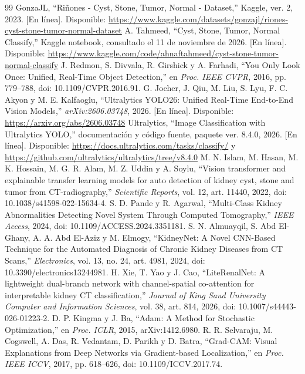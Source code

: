 \begin{thebibliography}{99}
GonzaJL, ``Riñones - Cyst, Stone, Tumor, Normal - Dataset,'' Kaggle, ver. 2, 2023. [En línea]. Disponible: \url{https://www.kaggle.com/datasets/gonzajl/riones-cyst-stone-tumor-normal-dataset}
A. Tahmeed, ``Cyst, Stone, Tumor, Normal Classify,'' Kaggle notebook, consultado el 11 de noviembre de 2026. [En línea]. Disponible: \url{https://www.kaggle.com/code/ahnaftahmeed/cyst-stone-tumor-normal-classify}
J. Redmon, S. Divvala, R. Girshick y A. Farhadi, ``You Only Look Once: Unified, Real-Time Object Detection,'' en \emph{Proc. IEEE CVPR}, 2016, pp. 779--788, doi: 10.1109/CVPR.2016.91.
G. Jocher, J. Qiu, M. Liu, S. Lyu, F. C. Akyon y M. E. Kalfaoglu, ``Ultralytics YOLO26: Unified Real-Time End-to-End Vision Models,'' \emph{arXiv:2606.03748}, 2026. [En línea]. Disponible: \url{https://arxiv.org/abs/2606.03748}
Ultralytics, ``Image Classification with Ultralytics YOLO,'' documentación y código fuente, paquete ver. 8.4.0, 2026. [En línea]. Disponible: \url{https://docs.ultralytics.com/tasks/classify/} y \url{https://github.com/ultralytics/ultralytics/tree/v8.4.0}
M. N. Islam, M. Hasan, M. K. Hossain, M. G. R. Alam, M. Z. Uddin y A. Soylu, ``Vision transformer and explainable transfer learning models for auto detection of kidney cyst, stone and tumor from CT-radiography,'' \emph{Scientific Reports}, vol. 12, art. 11440, 2022, doi: 10.1038/s41598-022-15634-4.
S. D. Pande y R. Agarwal, ``Multi-Class Kidney Abnormalities Detecting Novel System Through Computed Tomography,'' \emph{IEEE Access}, 2024, doi: 10.1109/ACCESS.2024.3351181.
S. N. Almuayqil, S. Abd El-Ghany, A. A. Abd El-Aziz y M. Elmogy, ``KidneyNet: A Novel CNN-Based Technique for the Automated Diagnosis of Chronic Kidney Diseases from CT Scans,'' \emph{Electronics}, vol. 13, no. 24, art. 4981, 2024, doi: 10.3390/electronics13244981.
H. Xie, T. Yao y J. Cao, ``LiteRenalNet: A lightweight dual-branch network with channel-spatial co-attention for interpretable kidney CT classification,'' \emph{Journal of King Saud University Computer and Information Sciences}, vol. 38, art. 814, 2026, doi: 10.1007/s44443-026-01223-2.
D. P. Kingma y J. Ba, ``Adam: A Method for Stochastic Optimization,'' en \emph{Proc. ICLR}, 2015, arXiv:1412.6980.
R. R. Selvaraju, M. Cogswell, A. Das, R. Vedantam, D. Parikh y D. Batra, ``Grad-CAM: Visual Explanations from Deep Networks via Gradient-based Localization,'' en \emph{Proc. IEEE ICCV}, 2017, pp. 618--626, doi: 10.1109/ICCV.2017.74.
\end{thebibliography}
